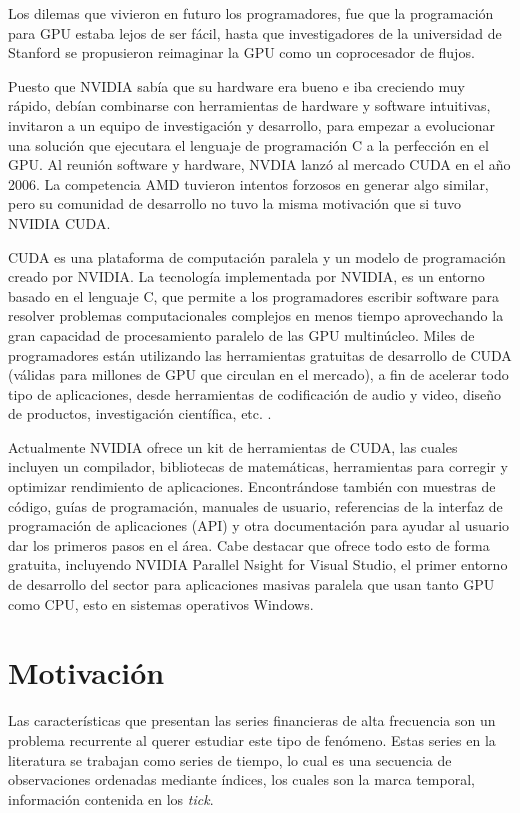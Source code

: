 Los dilemas que vivieron en futuro los programadores, fue que la programación para GPU estaba lejos de ser fácil, hasta que investigadores de la universidad de
Stanford se propusieron reimaginar la GPU como un coprocesador de flujos.

Puesto que NVIDIA sabía que su hardware era bueno e iba creciendo muy rápido, debían combinarse con herramientas de hardware y software intuitivas, invitaron
a un equipo de investigación y desarrollo, para empezar a evolucionar una solución que ejecutara el lenguaje de programación C a la perfección en el GPU.
Al reunión software y hardware, NVDIA lanzó al mercado CUDA en el año 2006. La competencia AMD tuvieron intentos forzosos en generar algo similar, pero su comunidad
de desarrollo no tuvo la misma motivación que si tuvo NVIDIA CUDA.

CUDA es una plataforma de computación paralela y un modelo de programación creado por NVIDIA. La tecnología implementada por NVIDIA, es un entorno basado en el 
lenguaje C, que permite a los programadores escribir software para resolver problemas computacionales complejos en menos tiempo aprovechando la gran capacidad 
de procesamiento paralelo de las GPU multinúcleo. Miles de programadores están utilizando las herramientas gratuitas de desarrollo de CUDA (válidas para millones 
de GPU que circulan en el mercado), a fin de acelerar todo tipo de aplicaciones, desde herramientas de codificación de audio y video, diseño de productos, 
investigación científica, etc. \cite{kirk2007nvidia}.

Actualmente NVIDIA ofrece un kit de herramientas de CUDA, las cuales incluyen un compilador, bibliotecas de matemáticas, herramientas para corregir y optimizar
rendimiento de aplicaciones. Encontrándose también con muestras de código, guías de programación, manuales de usuario, referencias de la interfaz de programación
de aplicaciones (API) y otra documentación para ayudar al usuario dar los primeros pasos en el área. Cabe destacar que ofrece todo esto de forma gratuita,
incluyendo NVIDIA Parallel Nsight for Visual Studio, el primer entorno de desarrollo del sector para aplicaciones masivas paralela que usan tanto GPU como CPU, esto
en sistemas operativos Windows.

\section{Motivación}

Las características que presentan las series financieras de alta frecuencia son un problema recurrente al querer estudiar este tipo de fenómeno. 
Estas series en la literatura se trabajan como series de tiempo, lo cual es una secuencia de observaciones ordenadas mediante índices, los cuales
son la marca temporal, información contenida en los \emph{tick}. 

